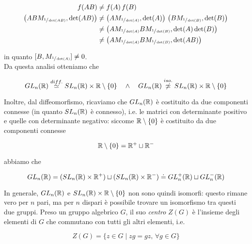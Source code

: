 \begin{align}
	\begin{split}
		f(A B) &\neq f(A) \, f(B)\\
		\left( A B M_{\sfrac{1}{\det(A B)}}, \det(A B) \right) &\neq \left( A M_{\sfrac{1}{\det(A)}},\det(A) \right) \, \left( B M_{\sfrac{1}{\det(B)}},\det(B) \right)\\
		&\neq \left( A M_{\sfrac{1}{\det(A)}} B M_{\sfrac{1}{\det(B)}},\det(A) \det(B) \right)\\
		&\neq \left( A M_{\sfrac{1}{\det(A)}} B M_{\sfrac{1}{\det(B)}},\det(A B) \right)
	\end{split}
\end{align}

in quanto $ [B, M_{\sfrac{1}{\det(A)}}] \neq 0 $.\\
Da questa analisi otteniamo che

\begin{equation}
	GL_{n}(\mathbb{R}) \stackrel{diff.}{\simeq} SL_{n}(\mathbb{R}) \times \mathbb{R} \setminus \{0\} \quad \wedge \quad GL_{n}(\mathbb{R}) \stackrel{iso.}{\not\simeq} SL_{n}(\mathbb{R}) \times \mathbb{R} \setminus \{0\}
\end{equation}

Inoltre, dal diffeomorfismo, ricaviamo che $ GL_{n}(\mathbb{R}) $ è costituito da due componenti connesse (in quanto $ SL_{n}(\mathbb{R}) $ è connesso), i.e. le matrici con determinante positivo e quelle con determinante negativo: siccome $ \mathbb{R} \setminus \{0\} $ è costituito da due componenti connesse

\begin{equation}
	\mathbb{R} \setminus \{0\} = \mathbb{R}^{+} \sqcup \mathbb{R}^{-}
\end{equation}

abbiamo che

\begin{equation}
	GL_{n}(\mathbb{R}) = (SL_{n}(\mathbb{R}) \times \mathbb{R}^{+}) \sqcup (SL_{n}(\mathbb{R}) \times \mathbb{R}^{-}) \doteq GL_{n}^{+}(\mathbb{R}) \sqcup GL_{n}^{-}(\mathbb{R})
\end{equation}

In generale, $ GL_{n}(\mathbb{R}) $ e $ SL_{n}(\mathbb{R}) \times \mathbb{R} \setminus \{0\} $ non sono quindi isomorfi: questo rimane vero per $ n $ pari, ma per $ n $ dispari è possibile trovare un isomorfismo tra questi due gruppi.
Preso un gruppo algebrico $ G $, il suo \textit{centro} $ Z(G) $ è l'insieme  degli elementi di $ G $ che commutano con tutti gli altri elementi, i.e.

\begin{equation}
	Z(G) = \{ z \in G \mid zg = gz, \, \forall g \in G \}
\end{equation}

